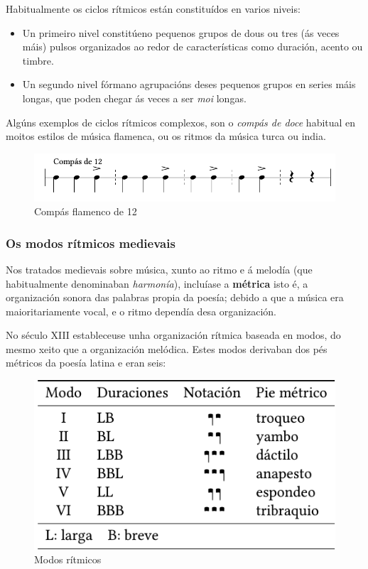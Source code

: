 \documentclass[a4paper, twoside]{templates/ociamthesis}
\providecommand{\tightlist}{%
  \setlength{\itemsep}{0pt}\setlength{\parskip}{0pt}}
\begin{document}
Habitualmente os ciclos rítmicos están constituídos en varios niveis:

\begin{itemize}
\tightlist
\item
  Un primeiro nivel constitúeno pequenos grupos de dous ou tres (ás veces máis) pulsos organizados ao redor de características como duración, acento ou timbre.
\item
  Un segundo nivel fórmano agrupacións deses pequenos grupos en series máis longas, que poden chegar ás veces a ser \emph{moi} longas.
\end{itemize}

Algúns exemplos de ciclos rítmicos complexos, son o \emph{compás de doce} habitual en moitos estilos de música flamenca, ou os ritmos da música turca ou india.

\begin{figure}
\centering
\includegraphics{figures/ud-03/ciclos-1.png}
\caption{Compás flamenco de 12}
\end{figure}

\hypertarget{os-modos-ruxedtmicos-medievais}{%
\subsubsection*{Os modos rítmicos medievais}\label{os-modos-ruxedtmicos-medievais}}

Nos tratados medievais sobre música, xunto ao ritmo e á melodía (que habitualmente denominaban \emph{harmonía}), incluíase a \textbf{métrica} isto é, a organización sonora das palabras propia da poesía; debido a que a música era maioritariamente vocal, e o ritmo dependía desa organización.

No século XIII estableceuse unha organización rítmica baseada en modos, do mesmo xeito que a organización melódica. Estes modos derivaban dos pés métricos da poesía latina e eran seis:

\begin{figure}
\centering
\includegraphics{figures/ud-03/modosritmicos.png}
\caption{Modos rítmicos}
\end{figure}
\end{document}
